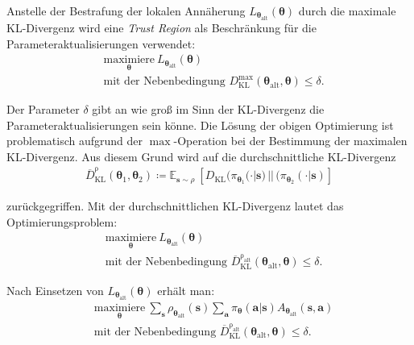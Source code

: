 Anstelle der Bestrafung der lokalen Annäherung $L_{\bm{\theta}_{\mathrm{alt}}}(\bm{\theta})$ durch die maximale KL-Divergenz wird eine \textit{Trust Region} als Beschränkung für die Parameteraktualisierungen verwendet:
\begin{align}
&\underset{\bm{\theta}}{\mathrm{maximiere}}~L_{\bm{\theta}_{\mathrm{alt}}}(\bm{\theta}) \\
&\text{mit der Nebenbedingung } D_{\mathrm{KL}}^{\mathrm{max}}(\bm{\theta}_{\mathrm{alt}}, \bm{\theta}) \leq \delta. \nonumber 
\end{align}

Der Parameter $\delta$ gibt an wie groß im Sinn der KL-Divergenz die Parameteraktualisierungen sein könne. Die Lösung der obigen Optimierung ist problematisch aufgrund der $\max$-Operation bei der Bestimmung der maximalen KL-Divergenz. Aus diesem Grund wird auf die durchschnittliche KL-Divergenz
\begin{align*}
\overline{D}_{\mathrm{KL}}^{\mathrm{\rho}}(\bm{\theta}_1, \bm{\theta}_2) \coloneqq
\mathds{E}_{\bm{s}\sim\rho}\
\left[ D_{\mathrm{KL}} (\pi_{\bm{\theta}_1}(\cdot|\bm{s})\,||\,(\pi_{\bm{\theta}_2}(\cdot|\bm{s})\right]
\end{align*}

zurückgegriffen. Mit der durchschnittlichen KL-Divergenz lautet das Optimierungsproblem:
\begin{align}
&\underset{\bm{\theta}}{\mathrm{maximiere}} ~L_{\bm{\theta}_{\mathrm{alt}}}(\bm{\theta}) \\
&\text{mit der Nebenbedingung } \overline{D}_{\mathrm{KL}}^{\mathrm{\rho}_{\mathrm{alt}}}(\bm{\theta}_{\mathrm{alt}}, \bm{\theta}) \leq \delta. \nonumber 
\label{eq:trpo_optimierung_allgemein}
\end{align}

Nach Einsetzen von 
$L_{\bm{\theta}_{\mathrm{alt}}}(\bm{\theta})$
erhält man:
\begin{align}
&\underset{\bm{\theta}}{\mathrm{maximiere}}~\sum\limits_{\bm{s}} \rho_{\bm{\theta}_{\mathrm{alt}}} (\bm{s})
\sum\limits_{\bm{a}} \pi_{\bm{\theta}}(\bm{a}|\bm{s}) A_{\bm{\theta}_{\mathrm{alt}}}(\bm{s},\bm{a}) \\ \label{eq:trpo_optimierung_eingesetzt} \nonumber
&\text{mit der Nebenbedingung } \overline{D}_{\mathrm{KL}}^{\mathrm{\rho}_{\mathrm{alt}}}(\bm{\theta}_{\mathrm{alt}}, \bm{\theta}) \leq \delta. 
\end{align}

